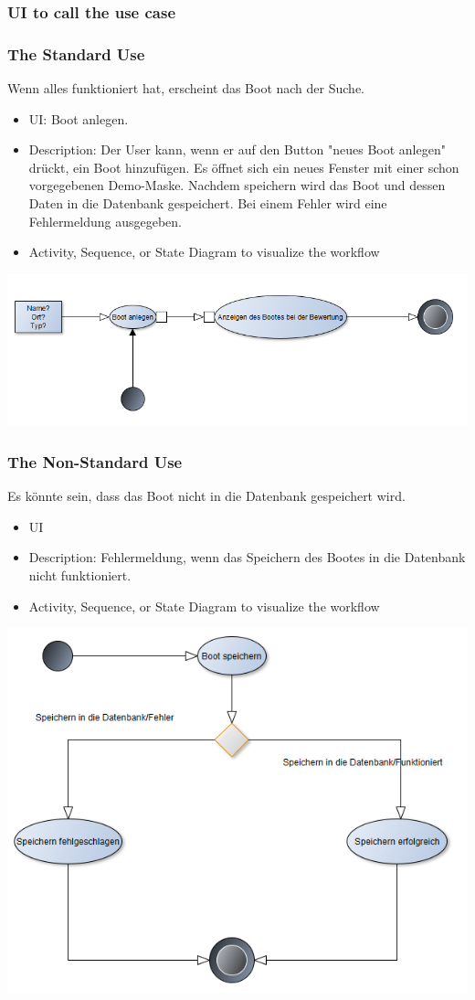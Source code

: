 \documentclass[12pt]{article}
\theoremstyle{definition}
\begin{document}
\subsubsection{UI to call the use case}

\subsubsection{The Standard Use}
Wenn alles funktioniert hat, erscheint das Boot nach der Suche.
\begin{itemize}
	\item UI: Boot anlegen.
	\item Description: Der User kann, wenn er auf den Button "neues Boot anlegen" drückt, ein Boot hinzufügen. Es öffnet sich ein neues Fenster mit einer schon vorgegebenen Demo-Maske. 
	Nachdem speichern wird das Boot und dessen Daten in die Datenbank gespeichert. Bei einem Fehler wird eine Fehlermeldung ausgegeben.
	\item Activity, Sequence, or State Diagram to visualize the workflow
\end{itemize}
\includegraphics[height=0.40\textwidth]{Boot_anlegen.PNG}

\subsubsection{The Non-Standard Use}
Es könnte sein, dass das Boot nicht in die Datenbank gespeichert wird.
\begin{itemize}
	\item UI
	\item Description: Fehlermeldung, wenn das Speichern des Bootes in die Datenbank nicht funktioniert.
	\item Activity, Sequence, or State Diagram to visualize the workflow
\end{itemize}
\includegraphics[height=0.40\textwidth]{Boot_anlegen_Fehler.PNG}
\pagebreak
\end{document}
